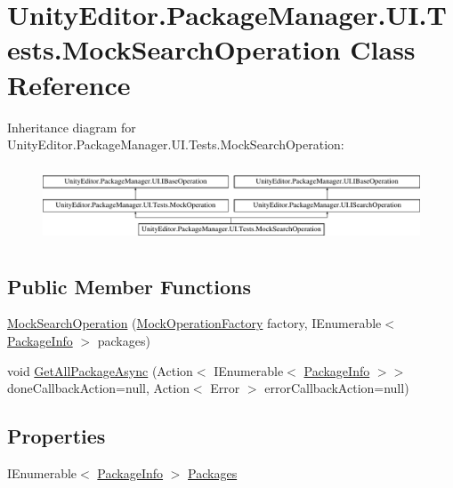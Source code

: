 \hypertarget{class_unity_editor_1_1_package_manager_1_1_u_i_1_1_tests_1_1_mock_search_operation}{}\section{Unity\+Editor.\+Package\+Manager.\+U\+I.\+Tests.\+Mock\+Search\+Operation Class Reference}
\label{class_unity_editor_1_1_package_manager_1_1_u_i_1_1_tests_1_1_mock_search_operation}
Inheritance diagram for Unity\+Editor.\+Package\+Manager.\+U\+I.\+Tests.\+Mock\+Search\+Operation\+:\begin{figure}[H]
\begin{center}
\leavevmode
\includegraphics[height=2.301370cm]{class_unity_editor_1_1_package_manager_1_1_u_i_1_1_tests_1_1_mock_search_operation}
\end{center}
\end{figure}
\subsection*{Public Member Functions}
\begin{DoxyCompactItemize}
\item 
\mbox{\hyperlink{class_unity_editor_1_1_package_manager_1_1_u_i_1_1_tests_1_1_mock_search_operation_a1e3de6863ff77b815516cb10a818bd1c}{Mock\+Search\+Operation}} (\mbox{\hyperlink{class_unity_editor_1_1_package_manager_1_1_u_i_1_1_tests_1_1_mock_operation_factory}{Mock\+Operation\+Factory}} factory, I\+Enumerable$<$ \mbox{\hyperlink{class_unity_editor_1_1_package_manager_1_1_u_i_1_1_package_info}{Package\+Info}} $>$ packages)
\item 
void \mbox{\hyperlink{class_unity_editor_1_1_package_manager_1_1_u_i_1_1_tests_1_1_mock_search_operation_add03cecd70ccc2ab64efe6787c5333a6}{Get\+All\+Package\+Async}} (Action$<$ I\+Enumerable$<$ \mbox{\hyperlink{class_unity_editor_1_1_package_manager_1_1_u_i_1_1_package_info}{Package\+Info}} $>$$>$ done\+Callback\+Action=null, Action$<$ Error $>$ error\+Callback\+Action=null)
\end{DoxyCompactItemize}
\subsection*{Properties}
\begin{DoxyCompactItemize}
\item 
I\+Enumerable$<$ \mbox{\hyperlink{class_unity_editor_1_1_package_manager_1_1_u_i_1_1_package_info}{Package\+Info}} $>$ \mbox{\hyperlink{class_unity_editor_1_1_package_manager_1_1_u_i_1_1_tests_1_1_mock_search_operation_a1e671eae830da11be4dd524642a966ee}{Packages}}
\end{DoxyCompactItemize}
